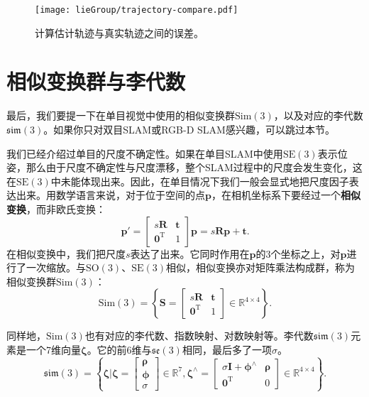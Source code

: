 \begin{figure}[!ht]
	\centering
	\texttt{[image: lieGroup/trajectory-compare.pdf]}
	\caption{计算估计轨迹与真实轨迹之间的误差。}
	\label{fig:trajectory-compare}
\end{figure}

\section{\textsuperscript{\ttfamily *}相似变换群与李代数}
最后，我们要提一下在单目视觉中使用的相似变换群$\mathrm{Sim}(3)$，以及对应的李代数$\mathfrak{sim}(3)$。如果你只对双目SLAM或RGB-D SLAM感兴趣，可以跳过本节。

我们已经介绍过单目的尺度不确定性。如果在单目SLAM中使用$\mathrm{SE}(3)$表示位姿，那么由于尺度不确定性与尺度漂移，整个SLAM过程中的尺度会发生变化，这在$\mathrm{SE}(3)$中未能体现出来。因此，在单目情况下我们一般会显式地把尺度因子表达出来。用数学语言来说，对于位于空间的点$\bm{p}$，在相机坐标系下要经过一个\textbf{相似变换}，而非欧氏变换：
\begin{equation}\label{key}
\bm{p}' = \left[ {\begin{array}{*{20}{c}}
	{s\bm{R}}&\bm{t}\\
	{{\bm{0}^\mathrm{T}}}&1
	\end{array}} \right] \bm{p}
	= s\bm{R} \bm{p} + \bm{t}.
\end{equation}
在相似变换中，我们把尺度$s$表达了出来。它同时作用在$\bm{p}$的3个坐标之上，对$\bm{p}$进行了一次缩放。与$\mathrm{SO}(3)$、$\mathrm{SE}(3)$相似，相似变换亦对矩阵乘法构成群，称为相似变换群$\mathrm{Sim}(3)$：
\begin{equation}\label{key}
\mathrm{Sim}(3) = \left\{ { \bm{S} = \left[ {\begin{array}{*{20}{c}}
		{s\bm{R}}& \bm{t}\\
		{{\bm{0}^\mathrm{T}}}&1
		\end{array}} \right] \in {\mathbb{R}^{4 \times 4}}} \right\}.
\end{equation}

同样地，$\mathrm{Sim}(3)$也有对应的李代数、指数映射、对数映射等。李代数$\mathfrak{sim}(3)$元素是一个7维向量$\bm{\zeta}$。它的前6维与$\mathfrak{se}(3)$相同，最后多了一项$\sigma$。
\begin{equation}
\mathfrak{sim} \left( 3 \right) = \left\{ { \bm{\zeta} | \bm{\zeta}  = \left[ \begin{array}{l}
	\bm{\rho} \\
	\bm{\phi} \\
	\sigma
	\end{array} \right] \in { \mathbb{R}^7},{ \bm{\zeta} ^ \wedge } = \left[ {\begin{array}{*{20}{c}}
		{\sigma \bm{I} + {\bm{\phi} ^ \wedge }}&\bm{\rho} \\
		{{\bm{0}^\mathrm{T}}}&0
		\end{array}} \right] \in {\mathbb{R}^{4 \times 4}}} \right\}.
\end{equation}

